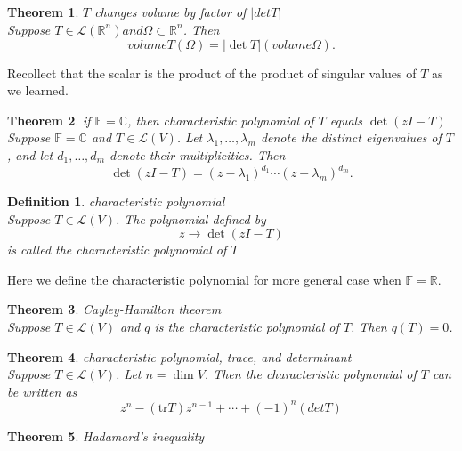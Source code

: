 \documentclass{article}
\newtheorem{theorem}{Theorem}[subsection]
\newtheorem{definition}{Definition}[subsection]
\newcommand{\RR}{\mathbb{R}}
\newcommand{\CC}{\mathbb{C}}
\newcommand{\FF}{\mathbb{F}}
\newcommand{\tr}{\text{tr}}
\begin{document}
\begin{CJK}{UTF8}{gkai}
\begin{theorem}
    $T$ changes volume by factor of $|detT|$\\

    Suppose $T \in \mathcal{L}(\RR^n) and \Omega \subset \RR^n$. Then
    \[volume T(\Omega) = |\det T|(volume \Omega).\]
\end{theorem}

Recollect that the scalar is the product of the product of singular values of $T$ as we learned.\\

\begin{theorem}
    if $\FF = \CC$, then characteristic polynomial of $T$ equals $\det(zI - T)$\\

    Suppose $\FF = \CC$ and $T \in \mathcal{L}(V)$. Let $\lambda_1,\ldots, \lambda_m$ denote the distinct eigenvalues
    of $T$, and let $d_1,\ldots,d_m$ denote their multiplicities. Then
    \[\det(zI - T) = (z- \lambda_1)^{d_1}\cdots(z- \lambda_m)^{d_m}.\]
\end{theorem}

\begin{definition}
    characteristic polynomial\\

    Suppose $T \in \mathcal{L}(V)$. The polynomial defined by
    \[z \to \det(zI -T)\]
    is called the characteristic polynomial of $T$
\end{definition}

Here we define the characteristic polynomial for more general case when $\FF = \RR$.

\begin{theorem}
    Cayley-Hamilton theorem\\

    Suppose $T \in \mathcal{L}(V)$ and $q$ is the characteristic polynomial of $T$. Then $q(T) = 0$.
\end{theorem}

\begin{theorem}
    characteristic polynomial, trace, and determinant\\

    Suppose $T \in \mathcal{L}(V)$. Let $n = \dim V$. Then the characteristic polynomial of $T$ can be written as
    \[z^n -(\tr T)z^{n-1} + \cdots+(-1)^n(detT)\]
\end{theorem}

\begin{theorem}
    Hadamard's inequality\\


\end{theorem}
\end{CJK}
\end{document}
